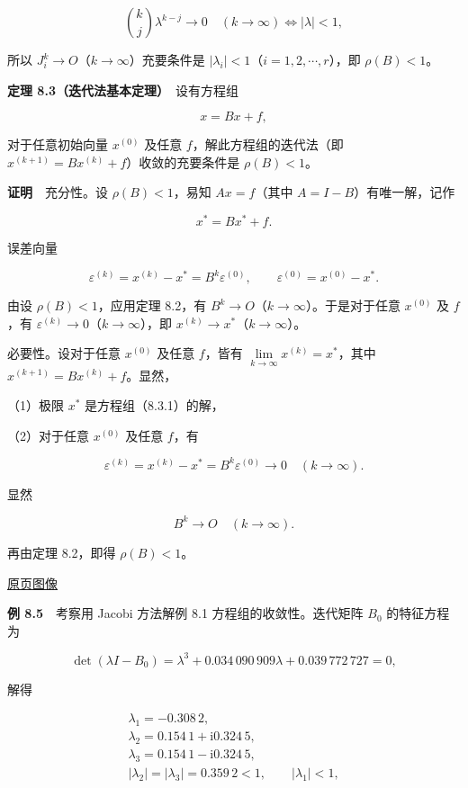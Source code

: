 \documentclass[
  10pt,
  fontset=fandol]{ctexart}
\begin{document}
\[
\binom{k}{j}\lambda^{k-j}\to0\quad(k\to\infty)\iff|\lambda|<1,
\]

所以 \(J_i^k\to O\)（\(k\to\infty\)）充要条件是 \(|\lambda_i|<1\)（\(i=1,2,\cdots,r\)），即 \(\rho(B)<1\)。

\textbf{定理 8.3（迭代法基本定理）}　设有方程组

\[
x=Bx+f,
\tag{8.3.1}
\]

对于任意初始向量 \(x^{(0)}\) 及任意 \(f\)，解此方程组的迭代法（即 \(x^{(k+1)}=Bx^{(k)}+f\)）收敛的充要条件是 \(\rho(B)<1\)。

\textbf{证明}　充分性。设 \(\rho(B)<1\)，易知 \(Ax=f\)（其中 \(A=I-B\)）有唯一解，记作

\[
x^*=Bx^*+f.
\tag{8.3.2}
\]

误差向量

\[
\varepsilon^{(k)}=x^{(k)}-x^*=B^k\varepsilon^{(0)},\qquad\varepsilon^{(0)}=x^{(0)}-x^*.
\]

由设 \(\rho(B)<1\)，应用定理 8.2，有 \(B^k\to O\)（\(k\to\infty\)）。于是对于任意 \(x^{(0)}\) 及 \(f\)，有 \(\varepsilon^{(k)}\to0\)（\(k\to\infty\)），即 \(x^{(k)}\to x^*\)（\(k\to\infty\)）。

必要性。设对于任意 \(x^{(0)}\) 及任意 \(f\)，皆有 \(\lim\limits_{k\to\infty}x^{(k)}=x^*\)，其中 \(x^{(k+1)}=Bx^{(k)}+f\)。显然，

（1）极限 \(x^*\) 是方程组（8.3.1）的解，

（2）对于任意 \(x^{(0)}\) 及任意 \(f\)，有

\[
\varepsilon^{(k)}=x^{(k)}-x^*=B^k\varepsilon^{(0)}\to0\quad(k\to\infty).
\]

显然

\[
B^k\to O\quad(k\to\infty).
\]

再由定理 8.2，即得 \(\rho(B)<1\)。

\href{../../source-images/pdf-222.jpeg}{原页图像}

\textbf{例 8.5}　考察用 Jacobi 方法解例 8.1 方程组的收敛性。迭代矩阵 \(B_0\) 的特征方程为

\[
\det(\lambda I-B_0)=\lambda^3+0.034\,090\,909\lambda+0.039\,772\,727=0,
\]

解得

\[
\begin{gathered}
\lambda_1=-0.308\,2,\\
\lambda_2=0.154\,1+\mathrm i0.324\,5,\\
\lambda_3=0.154\,1-\mathrm i0.324\,5,\\
|\lambda_2|=|\lambda_3|=0.359\,2<1,\qquad|\lambda_1|<1,
\end{gathered}
\]
\end{document}
